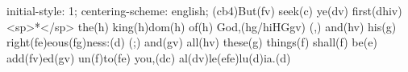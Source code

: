 initial-style: 1;
centering-scheme: english;
(cb4)But(fv) seek(c) ye(dv) first(dhiv) <sp>*</sp> the(h) king(h)dom(h) of(h) God,(hg/hiHGgv) (,) and(hv) his(g) right(fe)eous(fg)ness:(d) (;) and(gv) all(hv) these(g) things(f) shall(f) be(e) add(fv)ed(gv) un(f)to(fe) you,(dc) al(dv)le(efe)lu(d)ia.(d)

